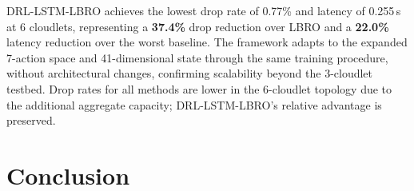 \documentclass[conference]{IEEEtran}
\begin{document}
\begin{table}[htbp]
\centering
\caption{Scalability: 6-Cloudlet Topology (3 seeds $\times$ 30 ep.,
state $\in\mathbb{R}^{41}$, 7 actions).}
\label{tab:scale}
\end{table}

DRL-LSTM-LBRO achieves the lowest drop rate of 0.77\% and latency
of 0.255\,s at 6 cloudlets, representing a \textbf{37.4\%} drop reduction
over LBRO and a \textbf{22.0\%} latency reduction over the worst
baseline. The framework adapts to the expanded 7-action space and
41-dimensional state through the same training procedure, without
architectural changes, confirming scalability beyond the 3-cloudlet
testbed. Drop rates for all methods are lower in the 6-cloudlet topology
due to the additional aggregate capacity; DRL-LSTM-LBRO's relative
advantage is preserved.

\section{Conclusion}
\label{sec:conclusion}
\end{document}
